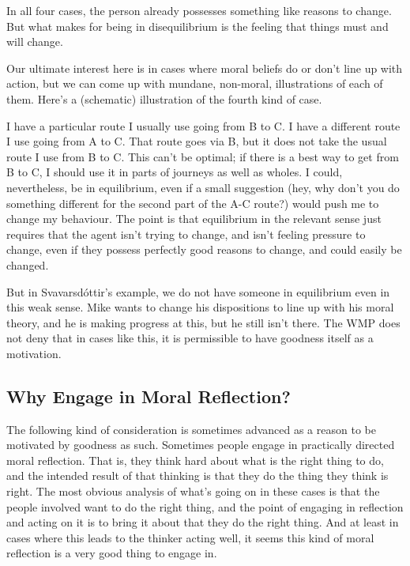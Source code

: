 \documentclass[
  10pt,
  letterpaper,
  twoside]{scrbook}
\begin{document}
In all four cases, the person already possesses something like reasons
to change. But what makes for being in disequilibrium is the feeling
that things must and will change.

Our ultimate interest here is in cases where moral beliefs do or don't
line up with action, but we can come up with mundane, non-moral,
illustrations of each of them. Here's a (schematic) illustration of the
fourth kind of case.

I have a particular route I usually use going from B to C. I have a
different route I use going from A to C. That route goes via B, but it
does not take the usual route I use from B to C. This can't be optimal;
if there is a best way to get from B to C, I should use it in parts of
journeys as well as wholes. I could, nevertheless, be in equilibrium,
even if a small suggestion (hey, why don't you do something different
for the second part of the A-C route?) would push me to change my
behaviour. The point is that equilibrium in the relevant sense just
requires that the agent isn't trying to change, and isn't feeling
pressure to change, even if they possess perfectly good reasons to
change, and could easily be changed.

But in Svavarsdóttir's example, we do not have someone in equilibrium
even in this weak sense. {Mike} wants to change his dispositions to line
up with his moral theory, and he is making progress at this, but he
still isn't there. The WMP does not deny that in cases like this, it is
permissible to have goodness itself as a motivation.

\subsection{Why Engage in Moral
Reflection?}\label{whyengageinmoralreflection}

The following kind of consideration is sometimes advanced as a reason to
be motivated by goodness as such. Sometimes people engage in practically
directed moral reflection. That is, they think hard about what is the
right thing to do, and the intended result of that thinking is that they
do the thing they think is right. The most obvious analysis of what's
going on in these cases is that the people involved want to do the right
thing, and the point of engaging in reflection and acting on it is to
bring it about that they do the right thing. And at least in cases where
this leads to the thinker acting well, it seems this kind of moral
reflection is a very good thing to engage in.
\end{document}
